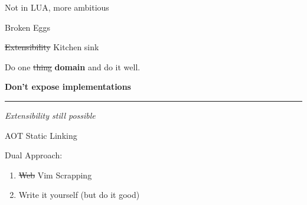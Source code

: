 \documentclass{beamer}
\begin{document}
\begin{frame}[standout]

	Not in LUA, more ambitious

\end{frame}


\begin{frame}{Broken Eggs}

	\begin{block}{\st{Extensibility} Kitchen sink}

		\vspace{0.5em}

		Do one \st{thing} \textbf{domain} and do it well.

		\vspace{0.5em}

		\textbf{Don't expose implementations}

	\end{block}

	\rule{\textwidth}{0.1em}

	\textit{Extensibility still possible}

\end{frame}


\begin{frame}{AOT Static Linking}

	\hspace{0.1em}

	Dual Approach:

	\begin{enumerate}

		\item \st{Web} Vim Scrapping

		\item Write it yourself (but do it good)

	\end{enumerate}

\end{frame}
\end{document}
